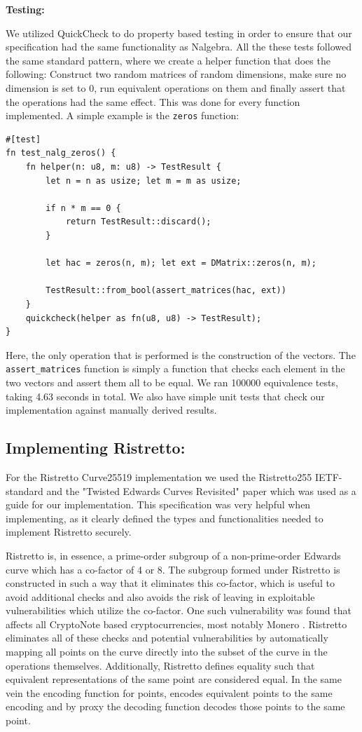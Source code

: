 \documentclass{article}
\begin{document}
\textbf{Testing:}

We utilized QuickCheck to do property based testing in order to ensure
that our specification had the same functionality as Nalgebra. All
the these tests followed the same standard pattern, where we create a
helper function that does the following: Construct two random matrices
of random dimensions, make sure no dimension is set to 0, run equivalent
operations on them and finally assert that the operations had the same
effect. This was done for every function implemented. A simple example 
is the \texttt{zeros} function:

\begin{lstlisting}
#[test]
fn test_nalg_zeros() {
	fn helper(n: u8, m: u8) -> TestResult {
		let n = n as usize; let m = m as usize;

		if n * m == 0 {
		    return TestResult::discard();
		}

		let hac = zeros(n, m); let ext = DMatrix::zeros(n, m);

		TestResult::from_bool(assert_matrices(hac, ext))
	}
	quickcheck(helper as fn(u8, u8) -> TestResult);
}
\end{lstlisting}

Here, the only operation that is performed is the construction of the
vectors. The \texttt{assert\_matrices} function is simply a function
that checks each element in the two vectors and assert them all to
be equal. We ran 100000 equivalence tests, taking 4.63 seconds in
total. We also have simple unit tests that check our implementation
against manually derived results.

\subsection{Implementing Ristretto:} \label{implementing-ristretto}

For the Ristretto Curve25519 implementation we used the Ristretto255
IETF-standard \cite{ristretto-ietf} and the "Twisted Edwards Curves
Revisited" paper \cite{edwards-curves} which was used as a guide for our
implementation. This specification was very helpful when implementing,
as it clearly defined the types and functionalities needed to implement
Ristretto securely.

Ristretto is, in essence, a prime-order subgroup of a non-prime-order
Edwards curve which has a co-factor of 4 or 8. The subgroup formed
under Ristretto is constructed in such a way that it eliminates this
co-factor, which is useful to avoid additional checks and also avoids
the risk of leaving in exploitable vulnerabilities which utilize the
co-factor. One such vulnerability was found that affects all CryptoNote
based cryptocurrencies, most notably Monero \cite{cryptonote}. Ristretto
eliminates all of these checks and potential vulnerabilities by
automatically mapping all points on the curve directly into the subset
of the curve in the operations themselves. Additionally, Ristretto
defines equality such that equivalent representations of the same point
are considered equal. In the same vein the encoding function for points,
encodes equivalent points to the same encoding and by proxy the decoding
function decodes those points to the same point.
\end{document}
